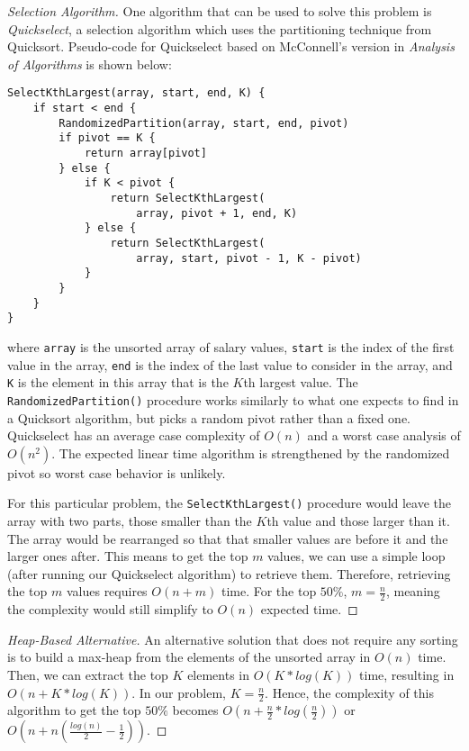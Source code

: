 \documentclass{scrartcl}
\begin{document}
\begin{flushleft}
\begin{proof}[Selection Algorithm]
        One algorithm that can be used to solve this problem is \textit{Quickselect}, a selection
        algorithm which uses the partitioning technique from Quicksort. Pseudo-code for Quickselect
        based on McConnell's version in \textit{Analysis of Algorithms} is shown below:
        \medskip
\begin{verbatim}
SelectKthLargest(array, start, end, K) {
    if start < end {
        RandomizedPartition(array, start, end, pivot)
        if pivot == K {
            return array[pivot]
        } else {
            if K < pivot {
                return SelectKthLargest(
                    array, pivot + 1, end, K)
            } else {
                return SelectKthLargest(
                    array, start, pivot - 1, K - pivot)
            }
        }
    }
}
\end{verbatim}
        where \verb|array| is the unsorted array of salary values, \verb|start| is the index of the
        first value in the array, \verb|end| is the index of the last value to consider in the
        array, and \verb|K| is the element in this array that is the $K$th largest value. The
        \verb|RandomizedPartition()| procedure works similarly to what one expects to find in a
        Quicksort algorithm, but picks a random pivot rather than a fixed one. Quickselect has an
        average case complexity of $O(n)$ and a worst case analysis of $O(n^2)$. The expected linear
        time algorithm is strengthened by the randomized pivot so worst case behavior is unlikely.
        \bigskip

        For this particular problem, the \verb|SelectKthLargest()| procedure would leave the array
        with two parts, those smaller than the $K$th value and those larger than it. The array would
        be rearranged so that that smaller values are before it and the larger ones after. This
        means to get the top $m$ values, we can use a simple loop (after running our Quickselect
        algorithm) to retrieve them. Therefore, retrieving the top $m$ values requires $O(n + m)$
        time. For the top $50\%$, $m = \frac{n}{2}$, meaning the complexity would still simplify to
        $O(n)$ expected time.
    \end{proof}
    \begin{proof}[Heap-Based Alternative]\let\qed\relax
        An alternative solution that does not require any sorting is to build a max-heap from the
        elements of the unsorted array in $O(n)$ time. Then, we can extract the top $K$ elements in
        $O(K * log(K))$ time, resulting in $O(n + K * log(K))$. In our problem, $K = \frac{n}{2}$.
        Hence, the complexity of this algorithm to get the top $50\%$ becomes $O(n + \frac{n}{2} *
        log(\frac{n}{2}))$ or $ O(n + n (\frac{log(n)}{2} - \frac{1}{2}))$.
    \end{proof}


\end{flushleft}
\end{document}
